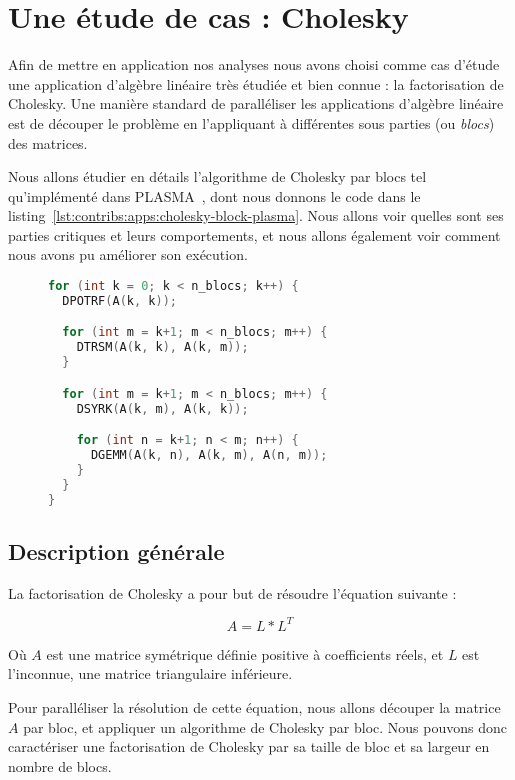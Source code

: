 \section{Une étude de cas : Cholesky}\label{sec:contribs:apps:cholesky}

Afin de mettre en application nos analyses nous avons choisi comme cas d'étude une application d'algèbre linéaire très étudiée et bien connue : la factorisation de Cholesky.
Une manière standard de paralléliser les applications d'algèbre linéaire est de découper le problème en l'appliquant à différentes sous parties (ou \emph{blocs}) des matrices.

Nous allons étudier en détails l'algorithme de Cholesky par blocs tel qu'implémenté dans PLASMA~\cite{Kurzak2013}, dont nous donnons le code dans le listing~\ref{lst:contribs:apps:cholesky-block-plasma}.
Nous allons voir quelles sont ses parties critiques et leurs comportements, et nous allons également voir comment nous avons pu améliorer son exécution.

\begin{figure}[h]
\begin{lstlisting}[language=c++,caption=Algorithme de Cholesky par bloc tel qu'exprimé dans PLASMA,label=lst:contribs:apps:cholesky-block-plasma]
for (int k = 0; k < n_blocs; k++) {
  DPOTRF(A(k, k));

  for (int m = k+1; m < n_blocs; m++) {
    DTRSM(A(k, k), A(k, m));
  }

  for (int m = k+1; m < n_blocs; m++) {
    DSYRK(A(k, m), A(k, k));

    for (int n = k+1; n < m; n++) {
      DGEMM(A(k, n), A(k, m), A(n, m));
    }
  }
}
\end{lstlisting}
\end{figure}


\subsection{Description générale}

La factorisation de Cholesky a pour but de résoudre l'équation suivante :

$$ A = L*L^T$$

Où $A$ est une matrice symétrique définie positive à coefficients réels, et $L$ est l'inconnue, une matrice triangulaire inférieure.

Pour paralléliser la résolution de cette équation, nous allons découper la matrice $A$ par bloc, et appliquer un algorithme de Cholesky par bloc.
Nous pouvons donc caractériser une factorisation de Cholesky par sa taille de bloc et sa largeur en nombre de blocs.

